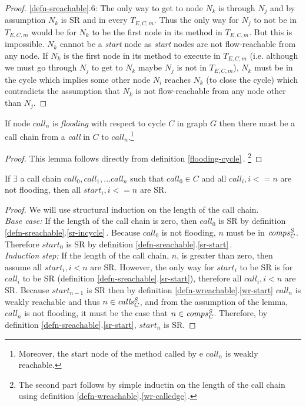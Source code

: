 \begin{proof}
\ref{defn-sreachable}.6: The only way to get to node $N_k$ is through $N_j$ and by assumption $N_k$ is SR and in every $T_{E,C,m}$.
Thus the only way for $N_j$ to not be in $T_{E,C,m}$ would be for $N_k$ to be the first node in its method in $T_{E,C,m}$.
But this is impossible.
$N_k$ cannot be a \emph{start} node as \emph{start} nodes are not flow-reachable from any node. 
If $N_k$ is the first node in its method to execute in $T_{E,C,m}$ (i.e. although we must go through $N_j$ to get to $N_k$ maybe
$N_j$ is not in $T_{E,C,m}$), $N_k$ must be in the cycle which implies some other node $N_i$ reaches $N_k$ (to close the cycle) 
which contradicts the assumption that $N_k$ is not flow-reachable from any node other than $N_j$.
\end{proof}

\begin{lemma}
\label{lemma-call-chain}
If node $call_n$ is \emph{flooding} with respect to cycle $C$ in graph $G$ then there must be a call chain from a \emph{call}
in $C$ to $call_n$.\footnote{
Moreover, the start node of the  method called by e $call_n$
 is weakly reachable.}
\end{lemma}

\begin{proof}%
This %
lemma follows directly from definition  \ref{flooding-cycle}\,.
\footnote{The second part follows by simple inductin on the length of the call chain
using  definition \ref{defn-wreachable}.\ref{wr-calledge}\,.}
\end{proof}

\begin{lemma}
\label{lemma-no-flood-chain}
If $\exists$ a call chain ${call}_0, {call}_1, ... {call}_n$ such that ${call}_0 \in C$ and all ${call}_i, i <= n$ are not flooding,
then all ${start}_i, i <= n$ are SR.
\end{lemma}

\begin{proof}%
We will use structural induction on the length of the call chain.\\
\emph{Base case:} If the length of the call chain is zero, then $call_0$ is SR by definition \ref{defn-sreachable}.\ref{sr-incycle}\,.
Because $call_0$ is not flooding, $n$ must be in $\mathit{comps_C^{S}}$. Therefore
${start}_0$ is SR by definition \ref{defn-sreachable}.\ref{sr-start}\,.
\\
\emph{
Induction step:} If the length of the call chain, $n$, is greater than zero, then assume all ${start}_i, i < n$ are SR.
However, the only way for ${start}_i$ to be SR is for ${call}_i$ to be SR (definition \ref{defn-sreachable}.\ref{sr-start}), therefore
all ${call}_i, i < n$ are SR. Because ${start}_{n-1}$ is SR then by definition \ref{defn-wreachable}.\ref{wr-start} ${call}_n$ is weakly
reachable and thus $n \in {\ensuremath{\mathit{calls_C^{S}}}}$, and from the assumption of the lemma, ${call}_n$ is not flooding,
it must be the case that $n \in {\ensuremath{\mathit{comps_C^{S}}}}$. 
Therefore, by definition \ref{defn-sreachable}.\ref{sr-start}, 
${start}_n$ is SR.
\end{proof}

